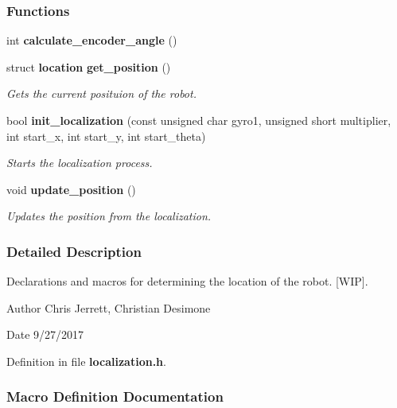 \subsubsection*{Functions}
\begin{DoxyCompactItemize}
\item 
int \textbf{ calculate\+\_\+encoder\+\_\+angle} ()
\item 
struct \textbf{ location} \textbf{ get\+\_\+position} ()
\begin{DoxyCompactList}\small\item\em Gets the current posituion of the robot. \end{DoxyCompactList}\item 
bool \textbf{ init\+\_\+localization} (const unsigned char gyro1, unsigned short multiplier, int start\+\_\+x, int start\+\_\+y, int start\+\_\+theta)
\begin{DoxyCompactList}\small\item\em Starts the localization process. \end{DoxyCompactList}\item 
void \textbf{ update\+\_\+position} ()
\begin{DoxyCompactList}\small\item\em Updates the position from the localization. \end{DoxyCompactList}\end{DoxyCompactItemize}


\subsubsection{Detailed Description}
Declarations and macros for determining the location of the robot. [W\+IP]. 

\begin{DoxyAuthor}{Author}
Chris Jerrett, Christian Desimone 
\end{DoxyAuthor}
\begin{DoxyDate}{Date}
9/27/2017 
\end{DoxyDate}


Definition in file \textbf{ localization.\+h}.



\subsubsection{Macro Definition Documentation}
\mbox{\label{a00032_a4fa0a97f6aafe983a46ffc7188d1fab5}} 
